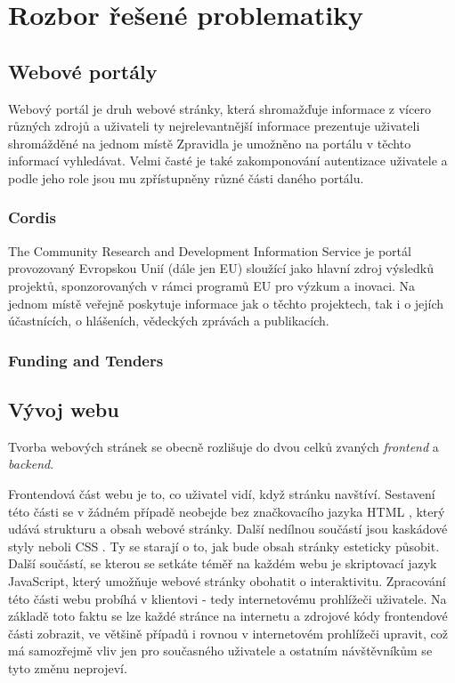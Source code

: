 \chapter{Rozbor řešené problematiky}

\section{Webové portály}
Webový portál je druh webové stránky, která shromažďuje informace z vícero různých zdrojů a uživateli ty nejrelevantnější informace prezentuje uživateli shromážděné na jednom místě %
Zpravidla je umožněno na portálu v těchto informací vyhledávat. Velmi časté je také zakomponování autentizace uživatele a podle jeho role jsou mu zpřístupněny různé části daného portálu. %
\blindtext[2]

\subsection{Cordis}
The Community Research and Development Information Service je portál provozovaný Evropskou Unií (dále jen EU) sloužící jako hlavní zdroj výsledků projektů, sponzorovaných v rámci programů EU pro výzkum a inovaci. Na jednom místě veřejně poskytuje informace jak o těchto projektech, tak i o jejích účastnících, o hlášeních, vědeckých zprávách a publikacích.
\blindtext

\subsection{Funding and Tenders}
\blindtext



\section{Vývoj webu}
Tvorba webových stránek se obecně rozlišuje do dvou celků zvaných \emph{frontend} a \emph{backend}.

Frontendová část webu je to, co uživatel vidí, když stránku navštíví. Sestavení této části se v žádném případě neobejde bez značkovacího jazyka HTML %
, který udává strukturu a obsah webové stránky. Další nedílnou součástí jsou kaskádové styly neboli CSS %
. Ty se starají o to, jak bude obsah stránky esteticky působit. Další součástí, se kterou se setkáte téměř na každém webu je skriptovací jazyk JavaScript, který umožňuje webové stránky obohatit o interaktivitu.
Zpracování této části webu probíhá v klientovi - tedy internetovému prohlížeči uživatele. Na základě toto faktu se lze každé stránce na internetu  a zdrojové kódy frontendové části zobrazit, ve většině případů i rovnou v internetovém prohlížeči upravit, což má samozřejmě vliv jen pro současného uživatele a ostatním návštěvníkům se tyto změnu neprojeví.

